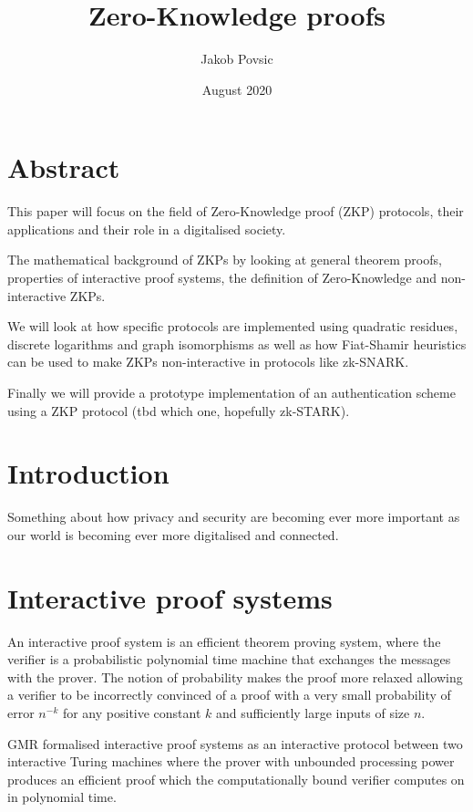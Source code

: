 \documentclass[12pt,a4paper]{article}
\title{Zero-Knowledge proofs}
\author{Jakob Povsic}
\date{August 2020}
\begin{document}

\maketitle
\newpage

\tableofcontents
\newpage

\section*{Abstract}
This paper will focus on the field of Zero-Knowledge proof (ZKP) protocols, their applications and their role in a digitalised society.

The mathematical background of ZKPs by looking at general theorem proofs, properties of interactive proof systems, the definition of Zero-Knowledge and non-interactive ZKPs.

We will look at how specific protocols are implemented using quadratic residues, discrete logarithms and graph isomorphisms as well as how Fiat-Shamir heuristics can be used to make ZKPs non-interactive in protocols like zk-SNARK.

Finally we will provide a prototype implementation of an authentication scheme using a ZKP protocol (tbd which one, hopefully zk-STARK).
\newpage

\section{Introduction}
Something about how privacy and security are becoming ever more important as our world is becoming ever more digitalised and connected.

\section{Interactive proof systems}
An interactive proof system is an efficient theorem proving system, where the verifier is a probabilistic polynomial time machine that exchanges the messages with the prover. The notion of probability makes the proof more relaxed allowing a verifier to be incorrectly convinced of a proof with a very small probability of error $n^{-k}$ for any positive constant $k$ and sufficiently large inputs of size $n$.

GMR \cite{10.1145/22145.22178} formalised interactive proof systems as an interactive protocol between two interactive Turing machines where the prover with unbounded processing power produces an efficient proof which the computationally bound verifier computes on in polynomial time.
\end{document}
